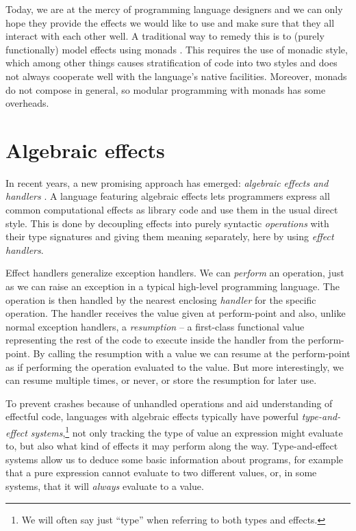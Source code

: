 \documentclass[a4paper, 11pt,titlepage, openright, twoside]{report}
\newcommand{\+}{\enspace}
\begin{document}
Today, we are at the mercy of programming language designers
and we can only hope they provide the
effects we would like to use and make sure that they all interact with
each other well.
A traditional way to remedy this is to (purely functionally) model effects using monads \cite{monads}.
This requires the use of monadic style, which among other things causes
stratification of code into two styles and does not always cooperate well with
the language's native facilities.
Moreover, monads do not compose in general, so modular programming with monads has some overheads.

\section{Algebraic effects}

In recent years, a new promising approach has emerged: \textit{algebraic effects and handlers} \cite{Plotkin_2013}.
A language featuring algebraic effects lets programmers express all common computational effects as library code
and use them in the usual direct style.
This is done by decoupling effects into purely syntactic {\em operations} with their type signatures
and giving them meaning separately, here by using {\em effect handlers}.

Effect handlers generalize exception handlers.
We can \textit{perform} an operation,
just as we can raise an exception in a typical high-level programming language.
The operation is then handled by the nearest enclosing \textit{handler} for the specific operation.
The handler receives the value given at perform-point and also,
unlike normal exception handlers,
a \textit{resumption} – a first-class functional value representing the rest
of the code to execute inside the handler from the perform-point.
By calling the resumption with a value we can resume at the perform-point
as if performing the operation evaluated to the value.
But more interestingly, we can resume multiple times, or never, or store the resumption for later use.

To prevent crashes because of unhandled operations and aid understanding of effectful code,
languages with algebraic effects typically have powerful
\textit{type-and-effect systems},\footnote{
We will often say just ``type'' when referring to both types and effects.}
not only tracking the type of value an expression might evaluate to, but also
what kind of effects it may perform along the way.
Type-and-effect systems allow us to deduce some basic information about programs,
for example that a pure expression cannot evaluate to two different values,
or, in some systems, that it will {\em always} evaluate to a value.
\end{document}
